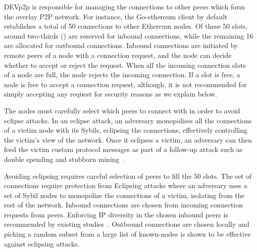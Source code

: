 DEVp2p is responsible for managing the connections to other peers which form the overlay P2P network. For instance,  the Go-ethereum client by default establishes a total of 50  connections to other Ethereum nodes.  Of these 50 slots, around two-thirds () are reserved for inbound connections,  while the remaining 16 are allocated for outbound connections. Inbound connections are initiated by remote peers of a node with a connection request, and the node can decide whether to accept or reject the request. When all the incoming connection slots of a node are full, the node rejects the incoming connection. If a slot is free, a node is free to accept a connection request, although, it is not recommended for simply accepting any request for security reasons as we explain below.

The nodes must carefully select which peers to connect with in order to avoid eclipse attacks. In an eclipse attack, an adversary monopolises all the connections of a victim node with its Sybils, \ie eclipsing the connections, effectively controlling the victim's view of the network. Once it eclipses a victim, an adversary can then feed the victim custom protocol messages as part of a follow-up attack such as double spending and stubborn mining~\cite{henningsen2019eclipsing}.


Avoiding eclipsing requires careful selection of peers to fill the 50 slots. The set of connections require protection from Eclipsing attacks where an adversary uses a set of Sybil nodes to monopolize the connections of a victim, isolating from the rest of the network. Inbound connections are chosen from incoming connection requests from peers. Enforcing IP diversity in the chosen inbound peers is recommended by existing studies~\cite{henningsen2019eclipsing, marcus2018low}. Outbound connections are chosen locally and picking a random subset from a large list of known-nodes is shown to be effective against eclipsing attacks. 


